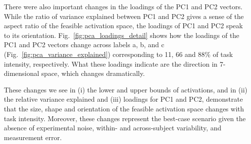 \documentclass[9pt,twocolumn,twoside,lineno]{pnas-new}
\begin{document}
There were also important changes in the loadings of the PC1 and PC2 vectors. While the ratio of variance explained between PC1 and PC2 gives a sense of the aspect ratio of the feasible activation space, the loadings of PC1 and PC2 speak to its orientation.
Fig.~\ref{fig:pca_loadings_detail} shows how the loadings of the PC1 and PC2 vectors change across labels a, b, and c (Fig.~\ref{fig:pca_variance_explained}) corresponding to 11, 66 and 88\% of task intensity, respectively.
What these loadings indicate are the direction in 7-dimensional space, which changes dramatically.

These changes we see in (i) the lower and upper bounds of activations, and in (ii) the relative variance explained and (iii) loadings for PC1 and PC2, demonstrate that the size, shape and orientation of the feasible activation space changes with task intensity. Moreover, these changes represent the best-case scenario given the absence of experimental noise, within- and across-subject variability, and measurement error.
\end{document}

